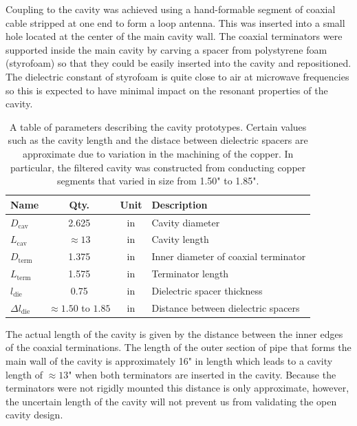 Coupling to the cavity was achieved using a hand-formable segment of coaxial cable stripped at one end to form a loop antenna. This was inserted into a small hole located at the center of the main cavity wall. The coaxial terminators were supported inside the main cavity by carving a spacer from polystyrene foam (styrofoam) so that they could be easily inserted into the cavity and repositioned. The dielectric constant of styrofoam is quite close to air at microwave frequencies so this is expected to have minimal impact on the resonant properties of the cavity. 

\begin{table}[htbp]
    \centering
    \caption{\label{tab:chap6-cavity-prototype-params} A table of parameters describing the cavity prototypes. Certain values such as the cavity length and the distace between dielectric spacers are approximate due to variation in the machining of the copper. In particular, the filtered cavity was constructed from conducting copper segments that varied in size from 1.50" to 1.85".}
    \begin{tabular}{l|c|c|l}
        \hline
        Name & Qty. & Unit & Description \\
        \hline
        $D_\mathrm{cav}$ & 2.625 & in & Cavity diameter\\
        $L_\mathrm{cav}$ & $\approx 13$ & in & Cavity length\\
        $D_\mathrm{term}$ & 1.375 & in & Inner diameter of coaxial terminator\\
        $L_\mathrm{term}$ & 1.575 & in & Terminator length\\
        \hline
        $l_\mathrm{die}$ & 0.75 & in & Dielectric spacer thickness\\
        $\Delta l_\mathrm{die}$ & $\approx 1.50$ to $1.85$ & in & Distance between dielectric spacers\\
        \hline
    \end{tabular}
\end{table}

The actual length of the cavity is given by the distance between the inner edges of the coaxial terminations. The length of the outer section of pipe that forms the main wall of the cavity is approximately 16" in length which leads to a cavity length of $\approx 13$" when both terminators are inserted in the cavity. Because the terminators were not rigidly mounted this distance is only approximate, however, the uncertain length of the cavity will not prevent us from validating the open cavity design.

